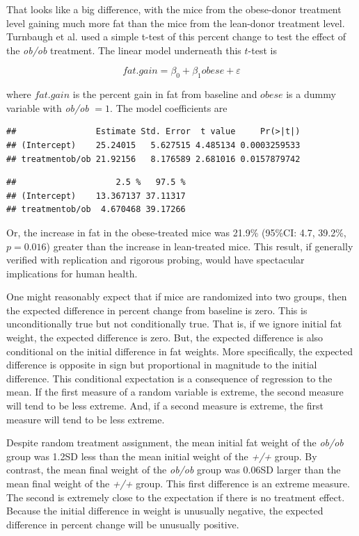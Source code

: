 \documentclass[]{book}
\begin{document}
That looks like a big difference, with the mice from the obese-donor
treatment level gaining much more fat than the mice from the lean-donor
treatment level. Turnbaugh et al. used a simple t-test of this percent
change to test the effect of the \emph{ob/ob} treatment. The linear
model underneath this \(t\)-test is

\begin{equation}
fat.gain = \beta_0 + \beta_1 obese + \varepsilon
\end{equation}

where \(fat.gain\) is the percent gain in fat from baseline and
\(obese\) is a dummy variable with \emph{ob/ob} \(= 1\). The model
coefficients are

\begin{verbatim}
##                Estimate Std. Error  t value     Pr(>|t|)
## (Intercept)    25.24015   5.627515 4.485134 0.0003259533
## treatmentob/ob 21.92156   8.176589 2.681016 0.0157879742
\end{verbatim}

\begin{verbatim}
##                    2.5 %   97.5 %
## (Intercept)    13.367137 37.11317
## treatmentob/ob  4.670468 39.17266
\end{verbatim}

Or, the increase in fat in the obese-treated mice was 21.9\% (95\%CI:
4.7, 39.2\%, \(p=0.016\)) greater than the increase in lean-treated
mice. This result, if generally verified with replication and rigorous
probing, would have spectacular implications for human health.

One might reasonably expect that if mice are randomized into two groups,
then the expected difference in percent change from baseline is zero.
This is unconditionally true but not conditionally true. That is, if we
ignore initial fat weight, the expected difference is zero. But, the
expected difference is also conditional on the initial difference in fat
weights. More specifically, the expected difference is opposite in sign
but proportional in magnitude to the initial difference. This
conditional expectation is a consequence of regression to the mean. If
the first measure of a random variable is extreme, the second measure
will tend to be less extreme. And, if a second measure is extreme, the
first measure will tend to be less extreme.

Despite random treatment assignment, the mean initial fat weight of the
\emph{ob/ob} group was 1.2SD less than the mean initial weight of the
\emph{+/+} group. By contrast, the mean final weight of the \emph{ob/ob}
group was 0.06SD larger than the mean final weight of the \emph{+/+}
group. This first difference is an extreme measure. The second is
extremely close to the expectation if there is no treatment effect.
Because the initial difference in weight is unusually negative, the
expected difference in percent change will be unusually positive.
\end{document}
